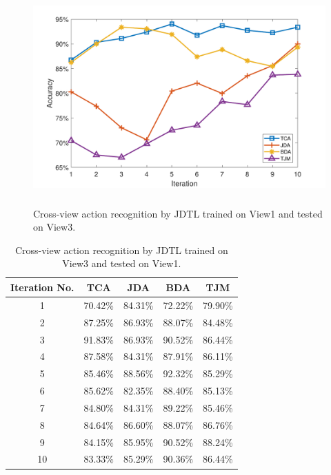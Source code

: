 \begin{figure}[hbt!]
	\centering
	\includegraphics[width=5in,height=3.25in]{figures/plots/View1-View3}
	\linebreak
	\caption{Cross-view action recognition by JDTL trained on View1 and tested on View3.}
	\label{fig1:View1-View3}
\end{figure}


\begin{table}[hbt!]
	\centering
	\caption{Cross-view action recognition by JDTL trained on View3 and tested on View1.} 
		\begin{tabular}{@{\extracolsep{12pt}}ccccc}
			\toprule
			Iteration No. &  TCA & JDA & BDA & TJM\\ 
			\hline
			\midrule
			1&	70.42\%&	84.31\%&	72.22\%&	79.90\%\\
			2&	87.25\%&	86.93\%&	88.07\%&	84.48\%\\
			3&	91.83\%&	86.93\%&	90.52\%&	86.44\%\\
			4&	87.58\%&	84.31\%&	87.91\%&	86.11\%\\
			5&	85.46\%&	88.56\%&	92.32\%&	85.29\%\\
			6&	85.62\%&	82.35\%&	88.40\%&	85.13\%\\
			7&	84.80\%&	84.31\%&	89.22\%&	85.46\%\\
			8&	84.64\%&	86.60\%&	88.07\%&	86.76\%\\
			9&	84.15\%&	85.95\%&	90.52\%&	88.24\%\\
			10&	83.33\%&	85.29\%&	90.36\%&	86.44\%\\
			\bottomrule
			\hline
			\midrule
		\end{tabular}%
	\label{table9}
\end{table}


